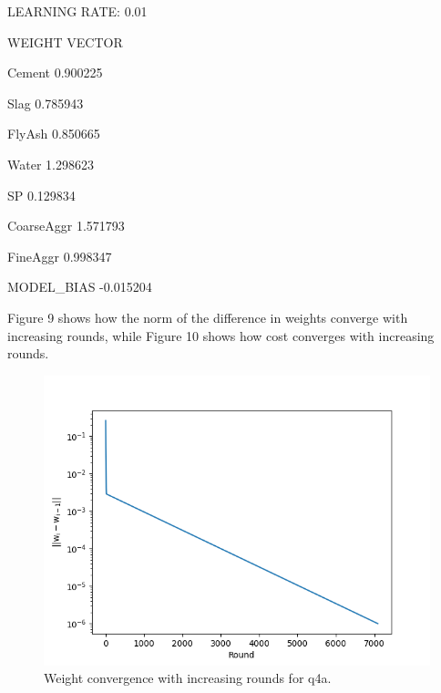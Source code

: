 \documentclass[12pt, fullpage,letterpaper]{article}
\begin{document}
\begin{enumerate}
\begin{enumerate}
        LEARNING RATE: 0.01
    
        WEIGHT VECTOR
        
        Cement        0.900225
        
        Slag          0.785943
        
        FlyAsh        0.850665
        
        Water         1.298623
        
        SP            0.129834
        
        CoarseAggr    1.571793
        
        FineAggr      0.998347
        
        MODEL\_BIAS   -0.015204
        
        Figure 9 shows how the norm of the difference in weights converge with increasing rounds, while Figure 10 shows how cost converges with increasing rounds.
        
        \begin{figure}[htp]
            \centering
            \includegraphics[width=12cm]{part2_q4a_convergence.png}
            \caption{Weight convergence with increasing rounds for q4a.}
            \label{fig:q4a}
        \end{figure}
        

\end{enumerate}
\end{enumerate}
\end{document}

